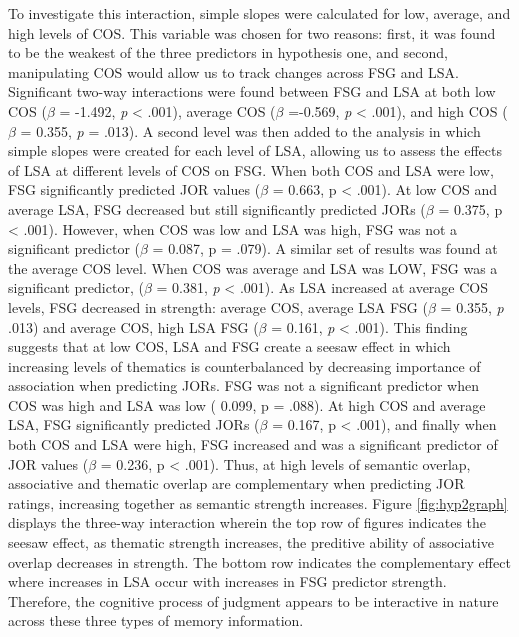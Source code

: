 \documentclass[english,man]{apa6}
\theoremstyle{definition}
\theoremstyle{definition}
\theoremstyle{definition}
\theoremstyle{remark}
\begin{document}
To investigate this interaction, simple slopes were calculated for low,
average, and high levels of COS. This variable was chosen for two
reasons: first, it was found to be the weakest of the three predictors
in hypothesis one, and second, manipulating COS would allow us to track
changes across FSG and LSA. Significant two-way interactions were found
between FSG and LSA at both low COS (\(\beta\) = -1.492, \emph{p}
\textless{} .001), average COS (\(\beta\) =-0.569, \emph{p} \textless{}
.001), and high COS (\(\beta\) = 0.355, \emph{p} = .013). A second level
was then added to the analysis in which simple slopes were created for
each level of LSA, allowing us to assess the effects of LSA at different
levels of COS on FSG. When both COS and LSA were low, FSG significantly
predicted JOR values (\(\beta\) = 0.663, p \textless{} .001). At low COS
and average LSA, FSG decreased but still significantly predicted JORs
(\(\beta\) = 0.375, p \textless{} .001). However, when COS was low and
LSA was high, FSG was not a significant predictor (\(\beta\) = 0.087, p
= .079). A similar set of results was found at the average COS level.
When COS was average and LSA was LOW, FSG was a significant predictor,
(\(\beta\) = 0.381, \emph{p} \textless{} .001). As LSA increased at
average COS levels, FSG decreased in strength: average COS, average LSA
FSG (\(\beta\) = 0.355, \emph{p} .013) and average COS, high LSA FSG
(\(\beta\) = 0.161, \emph{p} \textless{} .001). This finding suggests
that at low COS, LSA and FSG create a seesaw effect in which increasing
levels of thematics is counterbalanced by decreasing importance of
association when predicting JORs. FSG was not a significant predictor
when COS was high and LSA was low ( 0.099, p = .088). At high COS and
average LSA, FSG significantly predicted JORs (\(\beta\) = 0.167, p
\textless{} .001), and finally when both COS and LSA were high, FSG
increased and was a significant predictor of JOR values (\(\beta\) =
0.236, p \textless{} .001). Thus, at high levels of semantic overlap,
associative and thematic overlap are complementary when predicting JOR
ratings, increasing together as semantic strength increases. Figure
\ref{fig:hyp2graph} displays the three-way interaction wherein the top
row of figures indicates the seesaw effect, as thematic strength
increases, the preditive ability of associative overlap decreases in
strength. The bottom row indicates the complementary effect where
increases in LSA occur with increases in FSG predictor strength.
Therefore, the cognitive process of judgment appears to be interactive
in nature across these three types of memory information.
\end{document}
